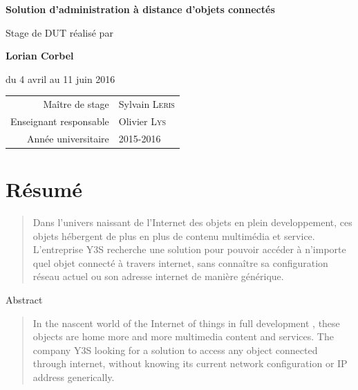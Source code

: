 \documentclass[a4paper,12pt]{book}
\begin{document}
\begin{titlepage}
{%
  \bfseries\LARGE
  Solution d'administration à distance d'objets connectés
}

Stage de DUT réalisé par\par\medskip
{\Large \bfseries Lorian Corbel}\par\medskip
du 4 avril au 11 juin 2016

\renewcommand{\arraystretch}{1.5}
\begin{tabular}{r@{\quad}l}
  Maître de stage & Sylvain \textsc{Leris} \\
  Enseignant responsable & Olivier \textsc{Lys} \\
  Année universitaire & 2015-2016
\end{tabular}
\end{titlepage}


\frontmatter



\chapter{Résumé}
\begin{quotation}
  Dans l'univers naissant de l'Internet des objets en plein
  developpement, ces objets hébergent de plus en plus de contenu
  multimédia et service. L'entreprise Y3S recherche une solution pour
  pouvoir accéder à n'importe quel objet connecté à travers internet,
  sans connaître sa configuration réseau actuel ou son adresse
  internet de manière générique.
\end{quotation}

\begingroup
\makeatletter
\renewcommand\chapter{%
  \@afterindentfalse
  \secdef\@chapter\@schapter
}

\begin{otherlanguage}{english}
  \chapter{Abstract}
  \begin{quotation}
    In the nascent world of the Internet of things in full development
    , these objects are home more and more multimedia content and
    services. The company Y3S looking for a solution to access any
    object connected through internet, without knowing its current
    network configuration or IP address generically.
  \end{quotation}
\end{otherlanguage}
\end{document}
